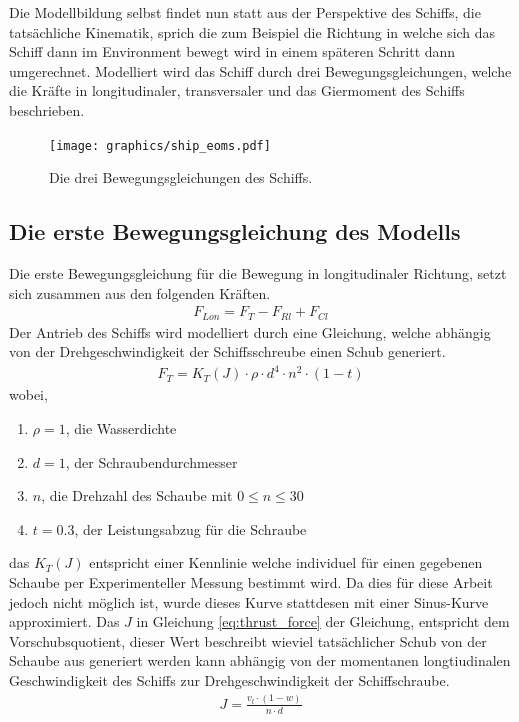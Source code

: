 \documentclass[]{iat}
\begin{document}
Die Modellbildung selbst findet nun statt aus der Perspektive des Schiffs, die tatsächliche Kinematik, sprich die zum Beispiel die Richtung in welche sich das Schiff dann im Environment bewegt wird in einem späteren Schritt dann umgerechnet.
Modelliert wird das Schiff durch drei Bewegungsgleichungen, welche die Kräfte in longitudinaler, transversaler und das Giermoment des Schiffs beschrieben.
\begin{figure}[H]
    \texttt{[image: graphics/ship\_eoms.pdf]}
    \centering
    \caption{Die drei Bewegungsgleichungen des Schiffs.}
    \label{abb:ship_eoms}
\end{figure}

\subsection{Die erste Bewegungsgleichung des Modells} \label{sec:eom1}
Die erste Bewegungsgleichung für die Bewegung in longitudinaler Richtung, setzt sich zusammen aus den folgenden Kräften.
\begin{align}
    F_{Lon} = F_{T} - F_{Rl} + F_{Cl} \label{eq:longitudinal_force}
\end{align}
Der Antrieb des Schiffs wird modelliert durch eine Gleichung, welche abhängig von der Drehgeschwindigkeit der Schiffsschreube einen Schub generiert.
\begin{align}
    F_{T} = K_T(J) \cdot \rho \cdot d^4 \cdot n^2 \cdot (1-t) \label{eq:thrust_force}
\end{align}
wobei,
\begin{enumerate}
    \item[] $\rho = 1$, die Wasserdichte
    \item[] $d = 1$, der Schraubendurchmesser
    \item[] $n$, die Drehzahl des Schaube mit $0 \leq n \leq 30$
    \item[] $t = 0.3$, der Leistungsabzug für die Schraube
\end{enumerate}
das $K_T(J)$ entspricht einer Kennlinie welche individuel für einen gegebenen Schaube per Experimenteller Messung bestimmt wird. Da dies für diese Arbeit jedoch nicht möglich ist, wurde dieses Kurve stattdesen mit einer Sinus-Kurve approximiert. Das $J$ in Gleichung \ref*{eq:thrust_force} der Gleichung, entspricht dem Vorschubsquotient, dieser Wert beschreibt wieviel tatsächlicher Schub von der Schaube aus generiert werden kann abhängig von der momentanen longtiudinalen Geschwindigkeit des Schiffs zur Drehgeschwindigkeit der Schiffschraube.
\begin{align}
    J = \frac{v_l \cdot (1-w)}{n \cdot d} \label{eq:thrust_coeffcient}
\end{align}
\end{document}
